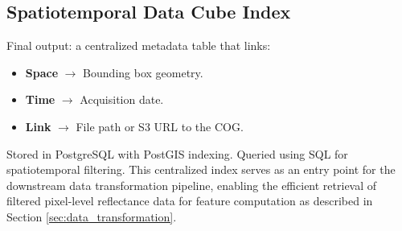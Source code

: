 \subsection{Spatiotemporal Data Cube Index}
Final output: a centralized metadata table that links:
\begin{itemize}
    \item \textbf{Space} $\rightarrow$ Bounding box geometry.
    \item \textbf{Time} $\rightarrow$ Acquisition date.
    \item \textbf{Link} $\rightarrow$ File path or S3 URL to the COG.
\end{itemize}
Stored in PostgreSQL with PostGIS indexing. Queried using SQL for spatiotemporal filtering. This centralized index serves as an entry point for the downstream data transformation pipeline, enabling the efficient retrieval of filtered pixel-level reflectance data for feature computation as described in Section \ref{sec:data_transformation}.
